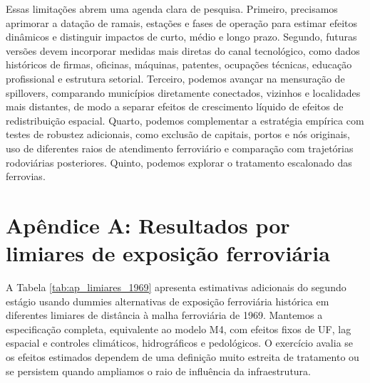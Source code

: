 \documentclass[12pt,a4paper]{article}
\begin{document}
Essas limitações abrem uma agenda clara de pesquisa. Primeiro, precisamos aprimorar a datação de ramais, estações e fases de operação para estimar efeitos dinâmicos e distinguir impactos de curto, médio e longo prazo. Segundo, futuras versões devem incorporar medidas mais diretas do canal tecnológico, como dados históricos de firmas, oficinas, máquinas, patentes, ocupações técnicas, educação profissional e estrutura setorial. Terceiro, podemos avançar na mensuração de spillovers, comparando municípios diretamente conectados, vizinhos e localidades mais distantes, de modo a separar efeitos de crescimento líquido de efeitos de redistribuição espacial. Quarto, podemos complementar a estratégia empírica com testes de robustez adicionais, como exclusão de capitais, portos e nós originais, uso de diferentes raios de atendimento ferroviário e comparação com trajetórias rodoviárias posteriores. Quinto, podemos explorar o tratamento escalonado das ferrovias.


\section*{Apêndice A: Resultados por limiares de exposição ferroviária}

A Tabela \ref{tab:ap_limiares_1969} apresenta estimativas adicionais do segundo estágio usando dummies alternativas de exposição ferroviária histórica em diferentes limiares de distância à malha ferroviária de 1969. Mantemos a especificação completa, equivalente ao modelo M4, com efeitos fixos de UF, lag espacial e controles climáticos, hidrográficos e pedológicos. O exercício avalia se os efeitos estimados dependem de uma definição muito estreita de tratamento ou se persistem quando ampliamos o raio de influência da infraestrutura.
\end{document}
